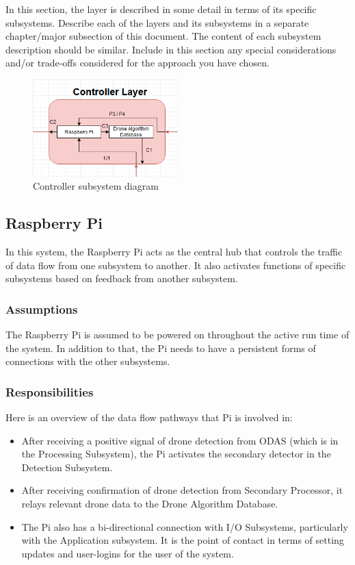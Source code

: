 In this section, the layer is described in some detail in terms of its specific subsystems. Describe each of the layers and its subsystems in a separate chapter/major subsection of this document. The content of each subsystem description should be similar. Include in this section any special considerations and/or trade-offs considered for the approach you have chosen.

\begin{figure}[h!]
	\centering
 	\includegraphics[width=0.50\textwidth]{images/controller}
 \caption{Controller subsystem diagram}
\end{figure}

\subsection{Raspberry Pi}
In this system, the Raspberry Pi acts as the central hub that controls the traffic of data flow from one subsystem to another. It also activates functions of specific subsystems based on feedback from another subsystem.

\subsubsection{Assumptions}
The Raspberry Pi is assumed to be powered on throughout the active run time of the system. In addition to that, the Pi needs to have a persistent forms of connections with the other subsystems.

\subsubsection{Responsibilities}
Here is an overview of the data flow pathways that Pi is involved in:
\begin{itemize}
  \item After receiving a positive signal of drone detection from ODAS (which is in the Processing Subsystem), the Pi activates the secondary detector in the Detection Subsystem. 
  \item After receiving confirmation of drone detection from Secondary Processor, it relays relevant drone data to the Drone Algorithm Database.
  \item The Pi also has a bi-directional connection with I/O Subsystems, particularly with the Application subsystem. It is the point of contact in terms of setting updates and user-logins for the user of the system.
\end{itemize}

